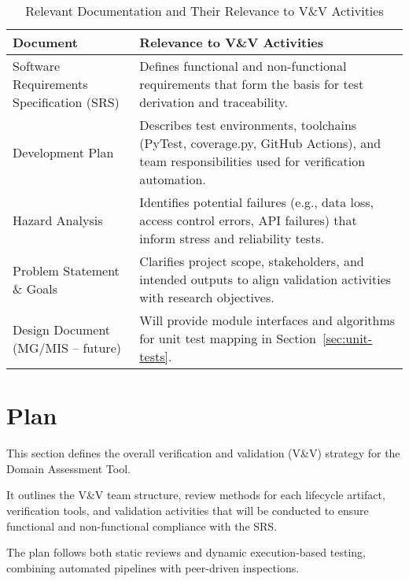 \documentclass[12pt, titlepage]{article}
\renewcommand{\arraystretch}{1.15}
\begin{document}

\begin{table}[H]
\centering
\caption{Relevant Documentation and Their Relevance to V\&V Activities}
\setlength{\tabcolsep}{5pt}
\renewcommand{\arraystretch}{1.2}
\footnotesize

\begin{tabularx}{\textwidth}{l X}
\toprule
\textbf{Document} & \textbf{Relevance to V\&V Activities} \\
\midrule
\arrayrulecolor[gray]{0.8}
Software Requirements Specification (SRS) &
Defines functional and non-functional requirements that form the basis for
test derivation and traceability. \\
\hline
Development Plan &
Describes test environments, toolchains (PyTest, coverage.py, GitHub Actions),
and team responsibilities used for verification automation. \\
\hline
Hazard Analysis &
Identifies potential failures (e.g., data loss, access control errors, API
failures) that inform stress and reliability tests. \\
\hline
Problem Statement \& Goals &
Clarifies project scope, stakeholders, and intended outputs to align validation
activities with research objectives. \\
\hline
Design Document (MG/MIS – future) &
Will provide module interfaces and algorithms for unit test mapping in
Section~\ref{sec:unit-tests}. \\
\bottomrule
\end{tabularx}
\end{table}

\section{Plan}
\label{sec:plan}
This section defines the overall verification and validation (V\&V) strategy for
the Domain Assessment Tool.

It outlines the V\&V team structure, review methods for each lifecycle artifact,
verification tools, and validation activities that will be conducted to ensure
functional and non-functional compliance with the SRS.

The plan follows both static reviews and dynamic execution-based testing,
combining automated pipelines with peer-driven inspections.
\end{document}
